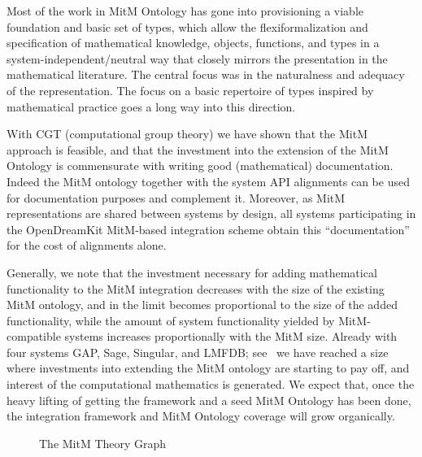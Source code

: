 \documentclass{deliverablereport}
\begin{document}
Most of the work in MitM Ontology has gone into provisioning a viable foundation
and basic set of types, which allow the flexiformalization and specification of
mathematical knowledge, objects, functions, and types in a system-independent/neutral way
that closely mirrors the presentation in the mathematical literature. The central focus
was in the naturalness and adequacy of the representation. The focus on a basic repertoire
of types inspired by mathematical practice goes a long way into this direction.

With CGT (computational group theory) we have shown that the MitM approach is feasible,
and that the investment into the extension of the MitM Ontology is commensurate with
writing good (mathematical) documentation. Indeed the MitM ontology together with the
system API alignments can be used for documentation purposes and complement it. Moreover, as
MitM representations are shared between systems by design, all systems participating in
the OpenDreamKit MitM-based integration scheme obtain this ``documentation'' for the cost
of alignments alone. 

Generally, we note that the investment necessary for adding mathematical functionality to
the MitM integration decreases with the size of the existing MitM ontology, and in the
limit becomes proportional to the size of the added functionality, while the amount of
system functionality yielded by MitM-compatible systems increases proportionally with the
MitM size. Already with four systems GAP, Sage, Singular, and LMFDB; see~\cite{ODK-D6.5}
we have reached a size where investments into extending the MitM ontology are starting to
pay off, and interest of the computational mathematics is generated. We expect that, once
the heavy lifting of getting the framework and a seed MitM Ontology has been done,
the integration framework and MitM Ontology coverage will grow organically.

\begin{figure}\centering
  \caption{The MitM Theory Graph}\label{fig:MitM-graph}
\end{figure}
\printbibliography 
\end{document}
